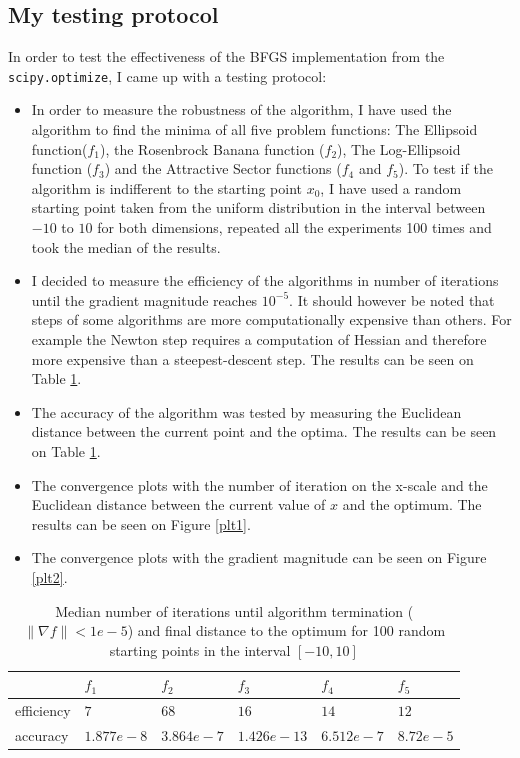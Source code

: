 \documentclass[a4paper]{article}
\begin{document}
\subsection{My testing protocol}
In order to test the effectiveness of the BFGS implementation from the
\texttt{scipy.optimize}, I came up with a testing protocol:
\begin{itemize}
\item In order to measure the robustness of the algorithm, I have used the
  algorithm to find the minima of all five problem functions: The Ellipsoid
  function($f_1$), the Rosenbrock Banana function ($f_2$), The Log-Ellipsoid
  function ($f_3$) and the Attractive Sector functions ($f_4$ and $f_5$).
  To test if the algorithm is indifferent to the starting point $x_0$, I have
  used a random starting point taken from the uniform distribution in the
  interval between $-10$ to $10$ for both dimensions,
  repeated all the experiments 100 times and took the median of the results.
\item I decided to measure the efficiency of the algorithms in number of
  iterations until the gradient magnitude reaches $10^{-5}$. It should however
  be noted that steps of some algorithms are more
  computationally expensive than others. For example the Newton step requires a
  computation of Hessian and therefore more expensive than a steepest-descent step.
  The results can be seen on Table \ref{table}.
\item The accuracy of the algorithm was tested by measuring the Euclidean distance
  between the current point and the optima. The results can be seen on Table \ref{table}.
\item The convergence plots with the number of iteration on the x-scale and the
  Euclidean distance between the current value of $x$ and the
  optimum. The results can be seen on Figure \ref{plt1}.
\item The convergence plots with the gradient magnitude
  can be seen on Figure \ref{plt2}.
\end{itemize}

\begin{table}[]
\centering
\begin{tabular}{|l|l|l|l|l|l|}
\hline
                 & $f_1$ & $f_2$   & $f_3$  & $f_4$  & $f_5$ \\ \hline
efficiency & $7$ & $68$ & $16$ & $14$ & $12$ \\ \hline
accuracy & $1.877e-8$  & $3.864e-7$ & $1.426e-13$  & $6.512e-7$  & $8.72e-5$ \\ \hline
\end{tabular}
\caption{Median number of iterations until algorithm termination ( $\| \nabla f \| < 1e-5$) and final distance to the optimum for 100 random starting points in the interval $[-10,10]$}
\label{table}
\end{table}
\end{document}
